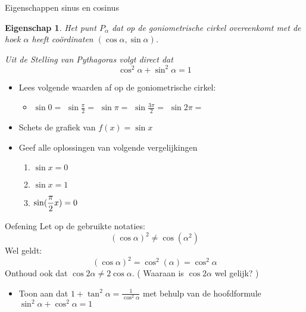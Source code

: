 \documentclass{beamer}
\theoremstyle{eigenschap}
\newtheorem{proposition}{Eigenschap}
\begin{document}
\begin{frame}{Eigenschappen sinus en cosinus}

\begin{proposition}
	Het punt $P_\alpha$ dat op de goniometrische cirkel overeenkomt met de hoek $\alpha$ heeft coördinaten $(\cos\alpha,\sin\alpha)$.
	
	Uit de Stelling van Pythagoras volgt direct dat 
	\begin{equation}
	\cos^2\alpha + \sin^2 \alpha = 1 \tag{Hoofdformule goniometrie}
	\end{equation}
	
\end{proposition}

%
\begin{itemize}
	\item Lees volgende waarden af op de goniometrische cirkel:
	\begin{itemize}
		\item[] $\sin 0= $ \hspace{2cm} $\sin \frac{\pi}{2}=$ \hspace{2cm} $\sin \pi=$ \hspace{2cm} $\sin \frac{ 3 \pi}{2}=$ \hspace{2cm} $\sin 2 \pi=$
		
	\end{itemize}
	\item Schets de grafiek van $f(x) = \sin x$
	\newpage
	\item Geef alle oplossingen van volgende  vergelijkingen
	\begin{enumerate}
		\item $\sin x = 0$
		\vspace{3mm}
		\item $\sin x  = 1$
		\vspace{3mm}
		\item $\displaystyle \sin ( \frac{\pi}{2} x) = 0$
	\end{enumerate}
\end{itemize}
%
\end{frame}

\begin{frame}{Oefening}
Let op de gebruikte notaties: 
$$
(\cos \alpha)^2 \neq \cos (\alpha^2)
$$ 
Wel geldt:
$$(\cos \alpha)^2 = \cos^2 (\alpha)= \cos^2 \alpha$$
Onthoud ook dat $\cos 2 \alpha \neq 2 \cos \alpha$. 
( Waaraan is $\cos 2\alpha$ wel gelijk? )
\begin{itemize}
	\item Toon aan dat $\displaystyle 1 + \tan^2 \alpha = \frac{1}{\cos^2 \alpha}$ met behulp van de hoofdformule $\sin^2 \alpha + \cos^2
	\alpha = 1$
\end{itemize}
\end{frame}
\end{document}
